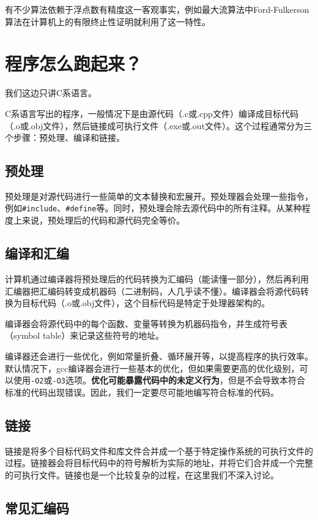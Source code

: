 \documentclass[../main.tex]{subfiles}
\begin{document}
有不少算法依赖于浮点数有精度这一客观事实，例如最大流算法中Ford-Fulkerson算法在计算机上的有限终止性证明就利用了这一特性。

\section{程序怎么跑起来？}

我们这边只讲C系语言。

C系语言写出的程序，一般情况下是由源代码（.c或.cpp文件）编译成目标代码（.o或.obj文件），然后链接成可执行文件（.exe或.out文件）。这个过程通常分为三个步骤：预处理、编译和链接。

\subsection{预处理}
预处理是对源代码进行一些简单的文本替换和宏展开。预处理器会处理一些指令，例如\texttt{\#include}、\texttt{\#define}等。同时，预处理会除去源代码中的所有注释。从某种程度上来说，预处理后的代码和源代码完全等价。

\subsection{编译和汇编}
计算机通过编译器将预处理后的代码转换为汇编码（能读懂一部分），然后再利用汇编器把汇编码转变成机器码（二进制码，人几乎读不懂）。编译器会将源代码转换为目标代码（.o或.obj文件），这个目标代码是特定于处理器架构的。

编译器会将源代码中的每个函数、变量等转换为机器码指令，并生成符号表（symbol table）来记录这些符号的地址。

编译器还会进行一些优化，例如常量折叠、循环展开等，以提高程序的执行效率。默认情况下，gcc编译器会进行一些基本的优化，但如果需要更高的优化级别，可以使用\texttt{-O2}或\texttt{-O3}选项。\textbf{优化可能暴露代码中的未定义行为}，但是不会导致本符合标准的代码出现错误。因此，我们一定要尽可能地编写符合标准的代码。

\subsection{链接}
链接是将多个目标代码文件和库文件合并成一个基于特定操作系统的可执行文件的过程。链接器会将目标代码中的符号解析为实际的地址，并将它们合并成一个完整的可执行文件。链接也是一个比较复杂的过程，在这里我们不深入讨论。

\subsection{常见汇编码}
\end{document}
